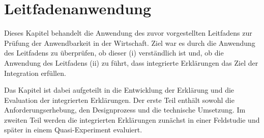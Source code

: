 \chapter{Leitfadenanwendung}
\label{sec:model_evaluation}

Dieses Kapitel behandelt die Anwendung des zuvor vorgestellten Leitfadens zur Prüfung der Anwendbarkeit in der Wirtschaft. Ziel war es durch die Anwendung des Leitfadens zu überprüfen, ob dieser (i) verständlich ist und, ob die Anwendung des Leitfadens (ii) zu führt, dass integrierte Erklärungen das Ziel der Integration erfüllen.

Das Kapitel ist dabei aufgeteilt in die Entwicklung der Erklärung und die Evaluation der integrierten Erklärungen. Der erste Teil enthält sowohl die Anforderungserhebung, den Designprozess und die technische Umsetzung. Im zweiten Teil werden die integrierten Erklärungen zunächst in einer Feldstudie und später in einem Quasi-Experiment evaluiert.



